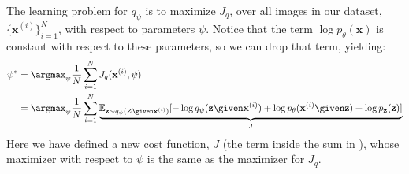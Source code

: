 The learning problem for $q_{\psi}$ is to maximize $J_q$, over all images in our dataset, $\{\mathbf{x}^{(i)}\}_{i=1}^N$, with respect to parameters $\psi$. Notice that the term $\log p_{\theta}(\mathbf{x})$ is constant with respect to these parameters, so we can drop that term, yielding:
\begin{align}
    \psi^* &= \argmax_{\psi} \frac{1}{N}\sum_{i=1}^N J_q(\mathbf{x}^{(i)}, \psi)\\
    &= \argmax_{\psi} \frac{1}{N}\sum_{i=1}^N \underbrace{\mathbb{E}_{\mathbf{z} \sim q_{\psi}(Z \given \mathbf{x}^{(i)})}[ -\log q_{\psi}(\mathbf{z} \given \mathbf{x}^{(i)}) + \log p_{\theta}(\mathbf{x}^{(i)} \given \mathbf{z}) + \log p_{\mathbf{z}}(\mathbf{z})]}_{J} \label{eqn:generative_modeling_and_representation_learning:J_q}
\end{align}
Here we have defined a new cost function, $J$ (the term inside the sum in \eqn{\ref{eqn:generative_modeling_and_representation_learning:J_q}}), whose maximizer with respect to $\psi$ is the same as the maximizer for $J_q$.

